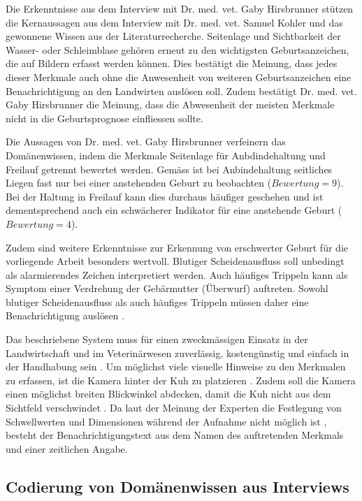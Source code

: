 Die Erkenntnisse aus dem Interview mit Dr. med. vet. Gaby Hirsbrunner \citep{Hirsbrunner2020} stützen die Kernaussagen aus dem Interview mit Dr. med. vet. Samuel Kohler und das gewonnene Wissen aus der Literaturrecherche. Seitenlage und Sichtbarkeit der Wasser- oder Schleimblase gehören erneut zu den wichtigsten Geburtsanzeichen, die auf Bildern erfasst werden können. Dies bestätigt die Meinung, dass jedes dieser Merkmale auch ohne die Anwesenheit von weiteren Geburtsanzeichen eine Benachrichtigung an den Landwirten auslösen soll. Zudem bestätigt Dr. med. vet. Gaby Hirsbrunner	die Meinung, dass die Abwesenheit der meisten Merkmale nicht in die Geburtsprognose einfliessen sollte.  

Die Aussagen von Dr. med. vet. Gaby Hirsbrunner verfeinern das Domänenwissen, indem die Merkmale Seitenlage für Anbdindehaltung und Freilauf getrennt bewertet werden. Gemäss \citep{Hirsbrunner2020} ist bei Anbindehaltung seitliches Liegen fast nur bei einer anstehenden Geburt zu beobachten ($Bewertung=9$). Bei der Haltung in Freilauf kann dies durchaus häufiger geschehen und ist dementsprechend auch ein schwächerer Indikator für eine anstehende Geburt ($Bewertung=4$).

Zudem sind weitere Erkenntnisse zur Erkennung von erschwerter Geburt für die vorliegende Arbeit besonders wertvoll. Blutiger Scheidenausfluss soll unbedingt als alarmierendes Zeichen interpretiert werden. Auch häufiges Trippeln kann als Symptom einer Verdrehung der Gebärmutter (Überwurf) auftreten. Sowohl blutiger Scheidenausfluss als auch häufiges Trippeln müssen daher eine Benachrichtigung auslösen \citep{Hirsbrunner2020}.

Das beschriebene System muss für einen zweckmässigen Einsatz in der Landwirtschaft und im Veterinärwesen zuverlässig, kostengünstig und einfach in der Handhabung sein \citep{Hirsbrunner2020}. Um möglichst viele visuelle Hinweise zu den Merkmalen zu erfassen, ist die Kamera hinter der Kuh zu platzieren \citep{Hirsbrunner2020, Kohler2020}. Zudem soll die Kamera einen möglichst breiten Blickwinkel abdecken, damit die Kuh nicht aus dem Sichtfeld verschwindet \cite{Muller2020}. Da laut der Meinung der Experten die Festlegung von Schwellwerten und Dimensionen während der Aufnahme nicht möglich ist \citep{Hirsbrunner2020, Kohler2020}, besteht der Benachrichtigungstext aus dem Namen des auftretenden Merkmals und einer zeitlichen Angabe.

\subsection{Codierung von Domänenwissen aus Interviews}

